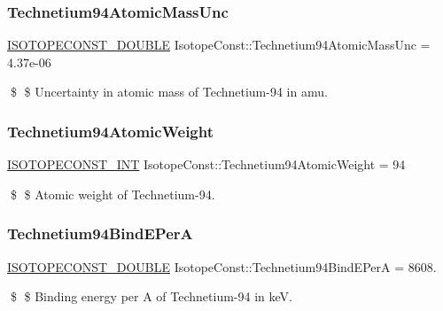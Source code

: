\subsubsection{\texorpdfstring{Technetium94\+Atomic\+Mass\+Unc}{Technetium94AtomicMassUnc}}
{\footnotesize\ttfamily \mbox{\hyperlink{group___isotope_const-_macros_ga8f45a7272ce02c0b4c65c44636ed719a}{I\+S\+O\+T\+O\+P\+E\+C\+O\+N\+S\+T\+\_\+\+D\+O\+U\+B\+LE}} Isotope\+Const\+::\+Technetium94\+Atomic\+Mass\+Unc = 4.\+37e-\/06}

\$ \$ Uncertainty in atomic mass of Technetium-\/94 in amu. \mbox{\label{group___isotope_const-_technetium-_tc94_ga5a79eea9e3d6f19c8c211399d994fd23}} 
\subsubsection{\texorpdfstring{Technetium94\+Atomic\+Weight}{Technetium94AtomicWeight}}
{\footnotesize\ttfamily \mbox{\hyperlink{group___isotope_const-_macros_ga5f18360b3e99483a35c32d789e62621c}{I\+S\+O\+T\+O\+P\+E\+C\+O\+N\+S\+T\+\_\+\+I\+NT}} Isotope\+Const\+::\+Technetium94\+Atomic\+Weight = 94}

\$ \$ Atomic weight of Technetium-\/94. \mbox{\label{group___isotope_const-_technetium-_tc94_ga056c51a776eee70992062d8fa5f7586f}} 
\subsubsection{\texorpdfstring{Technetium94\+Bind\+E\+PerA}{Technetium94BindEPerA}}
{\footnotesize\ttfamily \mbox{\hyperlink{group___isotope_const-_macros_ga8f45a7272ce02c0b4c65c44636ed719a}{I\+S\+O\+T\+O\+P\+E\+C\+O\+N\+S\+T\+\_\+\+D\+O\+U\+B\+LE}} Isotope\+Const\+::\+Technetium94\+Bind\+E\+PerA = 8608.}

\$ \$ Binding energy per A of Technetium-\/94 in keV. \mbox{\label{group___isotope_const-_technetium-_tc94_ga4aa38a6d381e84bd9624030b82efccdc}} 
